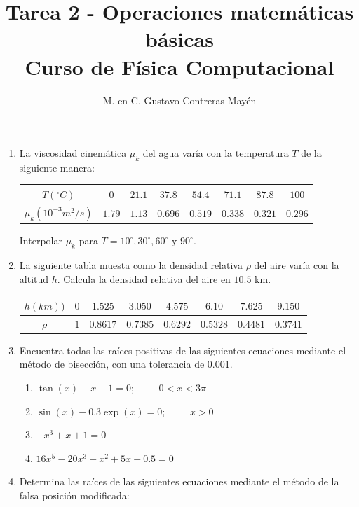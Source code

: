\documentclass[11pt]{article}
\title{Tarea 2 - Operaciones matemáticas básicas \\ Curso de Física Computacional}
\author{M. en C. Gustavo Contreras Mayén}
\date{ }
\renewcommand{\arraystretch}{1.5}
\begin{document}
\maketitle
\begin{enumerate}
\item La viscosidad cinemática $\mu_{k}$ del agua varía con la temperatura $T$ de la siguiente manera:
\begin{table}[H]
\centering
\begin{large} 
\begin{tabulary}{15cm}{c | c | c | c | c | c | c | c }
$T(^\circ C)$ & $0$ & $21.1$ & $37.8$ & $54.4$ & $71.1$ & $87.8$ & $100$ \\
\midrule
$\mu_{k} (10^{-3}m^{2}/s)$ & $1.79$ & $1.13$ & $0.696$ & $0.519$ & $0.338$ & $0.321$ & $0.296$ 
\end{tabulary}
\end{large}
\end{table}
Interpolar $\mu_{k}$ para $T= 10^{\circ},30^{\circ},60^{\circ}$ y $90^{\circ}$.
\item La siguiente tabla muesta como la densidad relativa $\rho$ del aire varía con la altitud $h$. Calcula la densidad relativa del aire en $10.5$ km.
\begin{table}[H]
\centering 
\begin{large}
\begin{tabulary}{15cm}{c | c | c | c | c | c | c | c }
$h(km))$ & $0$ & $1.525$ & $3.050$ & $4.575$ & $6.10$ & $7.625$ & $9.150$ \\
\midrule
$\rho$ & $1$ & $0.8617$ & $0.7385$ & $0.6292$ & $0.5328$ & $0.4481$ & $0.3741$ 
\end{tabulary}
\end{large}
\end{table}
\item Encuentra todas las raíces positivas de las siguientes ecuaciones mediante el método de bisección, con una tolerancia de 0.001.
\begin{enumerate}\label{grupo1}
\renewcommand{\arraystretch}{1.5}
\item $\tan(x) - x + 1 = 0; \hspace{1cm} 0 < x < 3\pi$
\item $\sin(x) - 0.3 \exp(x) = 0; \hspace{1cm} x > 0$
\item $-x^{3} + x + 1 = 0$
\item $16x^{5} - 20x^{3} + x^{2} + 5x - 0.5 = 0$
\end{enumerate}
\item Determina las raíces de las siguientes ecuaciones mediante el método de la falsa posición modificada:

\end{enumerate}
\end{document}
